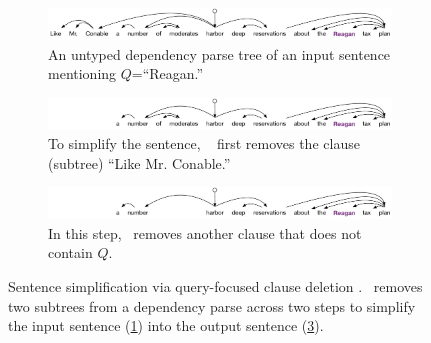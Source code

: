 

\begin{figure}
  \begin{subfigure}[t]{\textwidth}
    \centering
    \includegraphics[width=.65\textwidth]{figures/clause_deletion/clause_deletion_one.pdf}
    \caption[]{An untyped dependency parse tree %
    of an input sentence mentioning $Q$=``Reagan.''}\label{f:clause_deletion_1}
  \end{subfigure}\hfill
  \begin{subfigure}[t]{\textwidth}
    \centering
    \includegraphics[width=.65\textwidth]{figures/clause_deletion/clause_deletion_two.pdf}
    \caption[]{To simplify the sentence, \ours~ first removes the clause (subtree) ``Like Mr. Conable.''}\label{f:clause_deletion_2}
  \end{subfigure}
   \begin{subfigure}[t]{\textwidth}
    \centering
    \includegraphics[width=.65\textwidth]{figures/clause_deletion/clause_deletion_three.pdf}
    \caption[]{In this step, \ours~removes another clause that does not contain $Q$.\vspace{.25 cm}}\label{f:clause_deletion_3}
  \end{subfigure}
  \caption[Sentence simplification via query-focused clause deletion]{Sentence simplification via query-focused clause deletion \cite{Handler2019Query,Handler2019HumanAJ}. \ours~removes two subtrees from a dependency parse across two steps to simplify the input sentence (\ref{f:clause_deletion_1}) into the output sentence (\ref{f:clause_deletion_3}).}\label{f:clause_deletion}
\end{figure}
